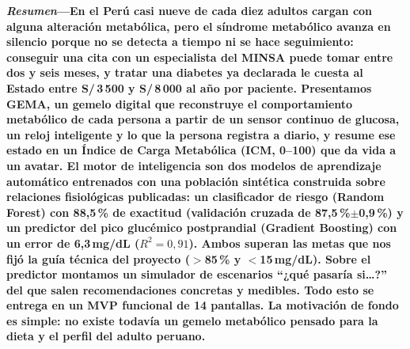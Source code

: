 \documentclass[9pt,letterpaper,twocolumn]{extarticle}
\begin{document}

\noindent\textbf{\textit{Resumen}---En el Perú casi nueve de cada diez adultos
cargan con alguna alteración metabólica, pero el síndrome metabólico avanza en
silencio porque no se detecta a tiempo ni se hace seguimiento: conseguir una
cita con un especialista del MINSA puede tomar entre dos y seis meses, y tratar
una diabetes ya declarada le cuesta al Estado entre S/\,3\,500 y S/\,8\,000 al
año por paciente. Presentamos GEMA, un gemelo digital que reconstruye el
comportamiento metabólico de cada persona a partir de un sensor continuo de
glucosa, un reloj inteligente y lo que la persona registra a diario, y resume
ese estado en un Índice de Carga Metabólica (ICM, 0--100) que da vida a un
avatar. El motor de inteligencia son dos modelos de aprendizaje automático
entrenados con una población sintética construida sobre relaciones fisiológicas
publicadas: un clasificador de riesgo (Random Forest) con 88,5\,\% de exactitud
(validación cruzada de 87,5\,\%$\pm$0,9\,\%) y un predictor del pico glucémico
postprandial (Gradient Boosting) con un error de 6,3\,mg/dL ($R^2=0{,}91$).
Ambos superan las metas que nos fijó la guía técnica del proyecto ($>$85\,\% y
$<$15\,mg/dL). Sobre el predictor montamos un simulador de escenarios
``¿qué pasaría si\ldots?'' del que salen recomendaciones concretas y medibles.
Todo esto se entrega en un MVP funcional de 14 pantallas. La motivación de fondo
es simple: no existe todavía un gemelo metabólico pensado para la dieta y el
perfil del adulto peruano.}
\end{document}
